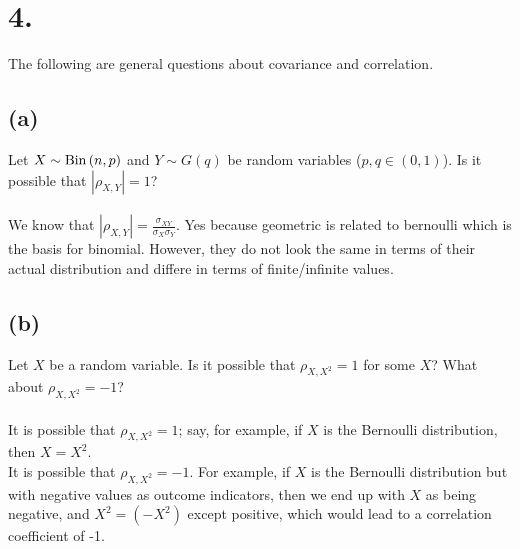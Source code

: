 \documentclass{article}
\begin{document}
\section*{4.}
{\Large 
The following are general questions about covariance and
correlation.

\subsection*{(a)}
Let $X\sim{\rm Bin}\left(n,p\right)$ and $Y\sim G\left(q\right)$
be random variables ($p,q\in\left(0,1\right)$). Is it possible that $\left|\rho_{X,Y}\right|=1$? \\ \\ 
We know that $|\rho_{X, Y}| = \frac{\sigma_{XY}}{\sigma_X \sigma_Y}$. Yes because geometric is related to bernoulli which is the basis for binomial. However, they do not look the same in terms of their actual distribution and differe in terms of finite/infinite values. 

\subsection*{(b)}
Let $X$ be a random variable. Is it possible that $\rho_{X,X^{2}}=1$ for some $X$? What about $\rho_{X,X^{2}}=-1$? \\ \\ 
It is possible that $\rho_{X, X^2} = 1$; say, for example, if $X$ is the Bernoulli distribution, then $X = X^2$. \\ 
It is possible that $\rho_{X, X^2} = -1$. For example, if $X$ is the Bernoulli distribution but with negative values as outcome indicators, then we end up with $X$ as being negative, and $X^2 = (-X^2)$ except positive, which would lead to a correlation coefficient of -1. \\ 

}
\end{document}
